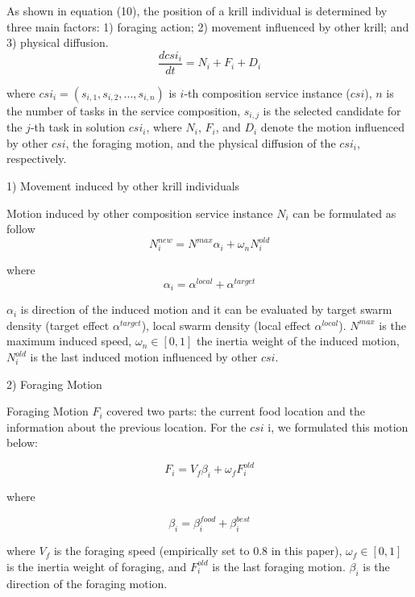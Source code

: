 \documentclass[10pt,journal,compsoc]{IEEEtran}
\begin{document}
As shown in equation (10), the position of a krill individual is determined by three main factors: 1) foraging action; 2) movement influenced by other krill; and 3) physical diffusion. 
\begin{equation}
\frac{dcsi_i}{dt} =N_i+F_i+D_i
\end{equation}

where $csi_i = (s_{i,1}, s_{i,2}, . . . , s_{i,n})$ is $i$-th composition service instance ($csi$), $n$ is the number of tasks in the service composition, $s_{i,j}$ is the selected candidate for the $j$-th task in solution $csi_i$, where $N_i$, $F_i$, and $D_i$ denote the motion influenced by other $csi$, the foraging motion, and the physical diffusion of the $csi_i$, respectively.

1) Movement induced by other krill individuals

Motion induced by other composition service instance $N_i$ can be formulated as follow
\begin{equation}
N^{new}_i = N^{max}\alpha_i + \omega_n N^{old}_i
\end{equation}

where
\begin{equation}
\alpha_i = \alpha^{local}+\alpha^{target}
\end{equation}

$\alpha_i$ is direction of the induced motion and it can be evaluated by target swarm density (target effect $\alpha^{target}$), local swarm density (local effect $\alpha^{local}$). $N^{max}$ is the maximum induced speed, $\omega_n \in [0, 1]$ the inertia weight of the induced motion, $N^{old}_{i}$ is the last induced motion influenced by other $csi$.

2) Foraging Motion

Foraging Motion $F_i$ covered two parts: the current food location and the information about the previous location. For the $csi$ i, we formulated this motion below:

\begin{equation}
F_i = V_f\beta_i + \omega_f F^{old}_i
\end{equation}

where

\begin{equation}
\beta_i = \beta_i^{food}+\beta_i^{best}
\end{equation}

where $V_f$ is the foraging speed (empirically set to $0.8$ in this paper), $\omega_f∈ [0, 1]$ is the inertia weight of foraging, and $F^{old}_i$ is the last foraging motion. $\beta_i$ is the direction of the foraging motion.
\end{document}
